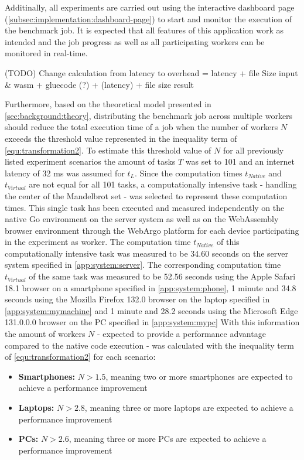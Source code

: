 Additinally, all experiments are carried out using the interactive dashboard page (\autoref{subsec:implementation:dashboard-page}) to start and monitor the execution of the benchmark job. It is expected that all features of this application work as intended and the job progress as well as all participating workers can be monitored in real-time.

(TODO) Change calculation from latency to overhead = latency + file Size input \& wasm + gluecode (?) + (latency) + file size result

Furthermore, based on the theoretical model presented in \autoref{sec:background:theory}, distributing the benchmark job across multiple workers should reduce the total execution time of a job when the number of workers $N$ exceeds the threshold value represented in the inequality term of \eqref{equ:transformation2}. To estimate this threshold value of $N$ for all previously listed experiment scenarios the amount of tasks $T$ was set to 101 and an internet latency of 32 ms \cite{backend:latency} was assumed for $t_{L}$. Since the computation times $t_{Native}$ and $t_{Virtual}$ are not equal for all 101 tasks, a computationally intensive task - handling the center of the Mandelbrot set - was selected to represent these computation times. This single task has been executed and measured independently on the native Go environment on the server system as well as on the WebAssembly browser environment through the WebArgo platform for each device participating in the experiment as worker. The computation time $t_{Native}$ of this computationally intensive task was measured to be 34.60 seconds on the server system specified in \autoref{app:system:server}. The corresponding computation time $t_{Virtual}$ of the same task was measured to be 52.56 seconds using the Apple Safari 18.1 \cite{evaluation:safari} browser on a smartphone specified in \autoref{app:system:phone}, 1 minute and 34.8 seconds using the Mozilla Firefox 132.0 \cite{background:firefox} browser on the laptop specified in \autoref{app:system:mymachine} and 1 minute and 28.2 seconds using the Microsoft Edge 131.0.0.0 \cite{evaluation:edge} browser on the \acs{PC} specified in \autoref{app:system:mypc} With this information the amount of workers $N$ - expected to provide a performance advantage compared to the native code execution - was calculated with the inequality term of \eqref{equ:transformation2} for each scenario:
\begin{itemize}
    \item \textbf{Smartphones:} $N > 1.5$, meaning two or more smartphones are expected to achieve a performance improvement 
    \item \textbf{Laptops:} $N > 2.8$, meaning three or more laptops are expected to achieve a performance improvement
    \item \textbf{PCs:} $N > 2.6$, meaning three or more \acs{PC}s are expected to achieve a performance improvement
\end{itemize}

